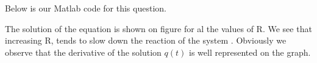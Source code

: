 Below is our Matlab code for this question.

The solution of the equation is shown on figure  for al the values of R. We see that increasing R, tends to slow down the reaction of the system . Obviously we observe that the derivative of the solution $q(t)$ is well represented on the graph.
 
